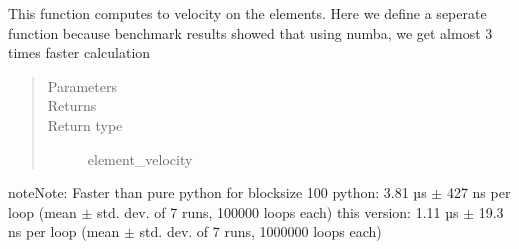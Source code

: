 \documentclass[letterpaper,10pt,english]{sphinxmanual}
\begin{document}
\begin{fulllineitems}
\label{\detokenize{documentation:elastica.interaction.node_to_element_velocity}}
This function computes to velocity on the elements.
Here we define a seperate function because benchmark results
showed that using numba, we get almost 3 times faster calculation
\begin{quote}\begin{description}
\item[{Parameters}] \leavevmode
{} \textendash{} 

\item[{Returns}] \leavevmode


\item[{Return type}] \leavevmode
element\_velocity

\end{description}\end{quote}

\begin{sphinxadmonition}{note}{Note:}
Faster than pure python for blocksize 100
python: 3.81 µs \(\pm\) 427 ns per loop (mean \(\pm\) std. dev. of 7 runs, 100000 loops each)
this version: 1.11 µs \(\pm\) 19.3 ns per loop (mean \(\pm\) std. dev. of 7 runs, 1000000 loops each)
\end{sphinxadmonition}

\end{fulllineitems}

\end{document}
